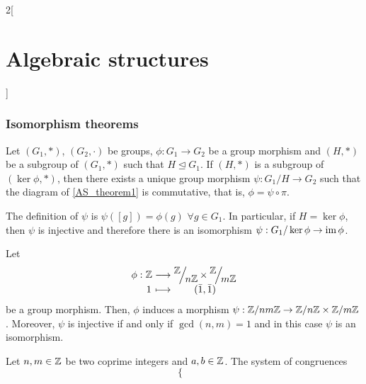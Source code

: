 \documentclass[../../../main.tex]{subfiles}
\begin{document}
\begin{multicols}{2}[\section{Algebraic structures}]
    \subsubsection{Isomorphism theorems}
    \begin{theorem}
        Let $(G_1,*)$, $(G_2,\cdot)$ be groups, $\phi:G_1\rightarrow G_2$ be a group morphism and $(H,*)$ be a subgroup of $(G_1,*)$ such that $H\unlhd G_1$. If $(H,*)$ is a subgroup of $(\ker\phi,*)$, then there exists a unique group morphism $\psi:G_1/H\rightarrow G_2$ such that the diagram of \cref{AS_theorem1} is commutative, that is, $\phi=\psi\circ\pi$.
        \begin{center}
            \begin{minipage}{\linewidth}
                \centering
                
                \label{AS_theorem1}
            \end{minipage}
        \end{center}
        The definition of $\psi$ is $\psi([g])=\phi(g)$ $\forall g\in G_1$.
        In particular, if $H=\ker\phi$, then $\psi$ is injective and therefore there is an isomorphism $\psi:G_1/\ker\phi\rightarrow\im\phi$.
    \end{theorem}
    \begin{theorem}
        Let
        \begin{equation*}
            \begin{array}{r@{\hspace{0.5\tabcolsep}}c@{\hspace{0.5\tabcolsep}}c@{\hspace{0.5\tabcolsep}}c}
                \phi: & \ZZ & \longrightarrow & \displaystyle\quot{\ZZ }{n\ZZ }\times\quot{\ZZ }{m\ZZ } \\
                      & 1   & \longmapsto     & (\Bar{1},\Bar{1})
            \end{array}
        \end{equation*}
        be a group morphism. Then, $\phi$ induces a morphism $\psi:\ZZ /nm\ZZ \rightarrow\ZZ /n\ZZ \times\ZZ /m\ZZ $. Moreover, $\psi$ is injective if and only if $\gcd(n,m)=1$ and in this case $\psi$ is an isomorphism.
    \end{theorem}
    \begin{corollary}
        Let $n,m\in\ZZ $ be two coprime integers and $a,b\in\ZZ $. The system of congruences $$\left\{\begin{array}{l}

\end{array}$$
\end{corollary}
\end{multicols}
\end{document}
